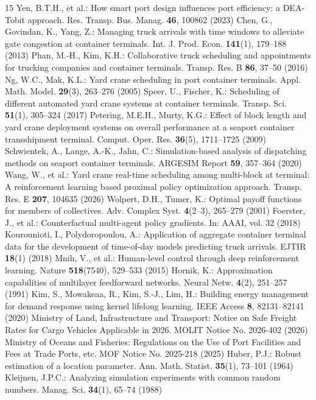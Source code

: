 \documentclass{llncs}
\begin{document}
\small
\begin{thebibliography}{15}
\setlength{\itemsep}{0pt}
\setlength{\parsep}{0pt}
 Yen, B.T.H., et al.: How smart port design influences port efficiency: a DEA-Tobit approach. Res. Transp. Bus. Manag. \textbf{46}, 100862 (2023)
 Chen, G., Govindan, K., Yang, Z.: Managing truck arrivals with time windows to alleviate gate congestion at container terminals. Int. J. Prod. Econ. \textbf{141}(1), 179--188 (2013)
 Phan, M.-H., Kim, K.H.: Collaborative truck scheduling and appointments for trucking companies and container terminals. Transp. Res. B \textbf{86}, 37--50 (2016)
 Ng, W.C., Mak, K.L.: Yard crane scheduling in port container terminals. Appl. Math. Model. \textbf{29}(3), 263--276 (2005)
 Speer, U., Fischer, K.: Scheduling of different automated yard crane systems at container terminals. Transp. Sci. \textbf{51}(1), 305--324 (2017)
 Petering, M.E.H., Murty, K.G.: Effect of block length and yard crane deployment systems on overall performance at a seaport container transshipment terminal. Comput. Oper. Res. \textbf{36}(5), 1711--1725 (2009)
 Schwientek, A., Lange, A.-K., Jahn, C.: Simulation-based analysis of dispatching methods on seaport container terminals. ARGESIM Report \textbf{59}, 357--364 (2020)
 Wang, W., et al.: Yard crane real-time scheduling among multi-block at terminal: A reinforcement learning based proximal policy optimization approach. Transp. Res. E \textbf{207}, 104635 (2026)
 Wolpert, D.H., Tumer, K.: Optimal payoff functions for members of collectives. Adv. Complex Syst. \textbf{4}(2--3), 265--279 (2001)
 Foerster, J., et al.: Counterfactual multi-agent policy gradients. In: AAAI, vol. 32 (2018)
 Kourounioti, I., Polydoropoulou, A.: Application of aggregate container terminal data for the development of time-of-day models predicting truck arrivals. EJTIR \textbf{18}(1) (2018)
 Mnih, V., et al.: Human-level control through deep reinforcement learning. Nature \textbf{518}(7540), 529--533 (2015)
 Hornik, K.: Approximation capabilities of multilayer feedforward networks. Neural Netw. \textbf{4}(2), 251--257 (1991)
 Kim, S., Mowakeaa, R., Kim, S.-J., Lim, H.: Building energy management for demand response using kernel lifelong learning. IEEE Access \textbf{8}, 82131--82141 (2020)
 Ministry of Land, Infrastructure and Transport: Notice on Safe Freight Rates for Cargo Vehicles Applicable in 2026. MOLIT Notice No. 2026-402 (2026)
 Ministry of Oceans and Fisheries: Regulations on the Use of Port Facilities and Fees at Trade Ports, etc. MOF Notice No. 2025-218 (2025)
 Huber, P.J.: Robust estimation of a location parameter. Ann. Math. Statist. \textbf{35}(1), 73--101 (1964)
 Kleijnen, J.P.C.: Analyzing simulation experiments with common random numbers. Manag. Sci. \textbf{34}(1), 65--74 (1988)
\end{thebibliography}
\end{document}
